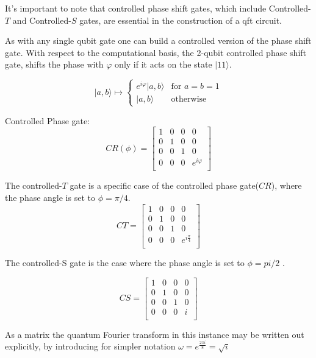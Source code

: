 \documentclass[inscr,ack,preface]{diphdthesis}
\begin{document}
It's important to note that controlled phase shift gates, which include Controlled-$T$ and Controlled-$S$ gates, are essential in the construction of a \acrshort{qft} circuit.

As with any single \acrshort{qubit} gate one can build a controlled version of the phase shift gate. With respect to the computational basis, the 2-\acrshort{qubit} controlled phase shift gate, shifts the phase with $\varphi$ only if it acts on the state $|11\rangle$\cite{cphase}.

\[
|a,b\rangle \mapsto
\begin{cases}
e^{i\varphi}|a,b\rangle & \text{for } a=b=1 \\
|a,b\rangle & \text{otherwise}
\end{cases}
\]

Controlled Phase gate:
\[
\text{$CR(\phi)$} =
\begin{bmatrix}
    1 & 0 & 0 & 0 \\
    0 & 1 & 0 & 0 \\
    0 & 0 & 1 & 0 \\
    0 & 0 & 0 & e^{i\varphi} \\
\end{bmatrix}
\]

The controlled-$T$ gate is a specific case of the controlled phase gate($CR$), where the phase angle is set to $\phi = \pi/ 4 $.
\[
\text{$CT$} =
\begin{bmatrix}
    1 & 0 & 0 & 0 \\
    0 & 1 & 0 & 0 \\
    0 & 0 & 1 & 0 \\
    0 & 0 & 0 & e^{i\frac{\pi}{4}} \\
\end{bmatrix}
\]

The controlled-S gate is the case where the phase angle is set to $\phi = pi / 2 $ \cite{niel}.

\[
\text{$CS$} =
\begin{bmatrix}
    1 & 0 & 0 & 0 \\
    0 & 1 & 0 & 0 \\
    0 & 0 & 1 & 0 \\
    0 & 0 & 0 & i \\
\end{bmatrix}
\]

As a matrix the quantum Fourier transform in this instance may be written out explicitly, by introducing for simpler notation \Large$\omega= e^{\frac{2\pi i}{8}} = \sqrt{i}$ \normalsize \cite{niel}
\end{document}
